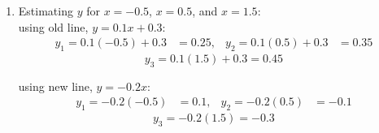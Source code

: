 \documentclass[a4paper,12pt]{article}
\begin{document}
\begin{enumerate}[label=\alph*)]
    \item Estimating \(y\) for \(x = -0.5\), \(x = 0.5\), and \(x = 1.5\):\\
    using old line, \(y = 0.1x + 0.3\):
    \[
    \begin{aligned}
        y_1 = 0.1(-0.5) + 0.3 &= 0.25, &y_2 = 0.1(0.5) + 0.3 &= 0.35
    \end{aligned}
    \]
    \[
    y_3 = 0.1(1.5) + 0.3 = 0.45
    \]

    using new line, \(y = -0.2x\):
    \[
    \begin{aligned}
        y_1 = -0.2(-0.5) &= 0.1, &y_2 = -0.2(0.5) &= -0.1
    \end{aligned}
    \]
    \[
    y_3 = -0.2(1.5) = -0.3
    \]
\end{enumerate}
\end{document}
